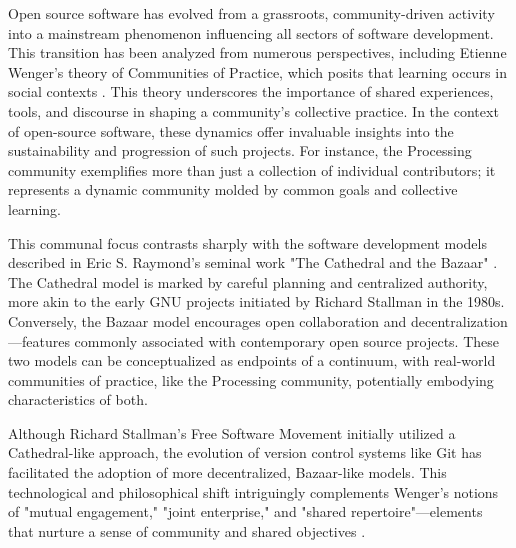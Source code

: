
Open source software has evolved from a grassroots, community-driven activity into a mainstream phenomenon influencing all sectors of software development. This transition has been analyzed from numerous perspectives, including Etienne Wenger's theory of Communities of Practice, which posits that learning occurs in social contexts \parencite{wengerCommunitiesPracticeLearning1998}. This theory underscores the importance of shared experiences, tools, and discourse in shaping a community's collective practice. In the context of open-source software, these dynamics offer invaluable insights into the sustainability and progression of such projects. For instance, the Processing community exemplifies more than just a collection of individual contributors; it represents a dynamic community molded by common goals and collective learning.

This communal focus contrasts sharply with the software development models described in Eric S. Raymond's seminal work "The Cathedral and the Bazaar" \parencite{CathedralBazaarMusings2002a}. The Cathedral model is marked by careful planning and centralized authority, more akin to the early GNU projects initiated by Richard Stallman in the 1980s. Conversely, the Bazaar model encourages open collaboration and decentralization—features commonly associated with contemporary open source projects. These two models can be conceptualized as endpoints of a continuum, with real-world communities of practice, like the Processing community, potentially embodying characteristics of both.

Although Richard Stallman's Free Software Movement initially utilized a Cathedral-like approach, the evolution of version control systems like Git has facilitated the adoption of more decentralized, Bazaar-like models. This technological and philosophical shift intriguingly complements Wenger's notions of "mutual engagement," "joint enterprise," and "shared repertoire"—elements that nurture a sense of community and shared objectives \parencite{wengerCommunitiesPracticeLearning1998}.

